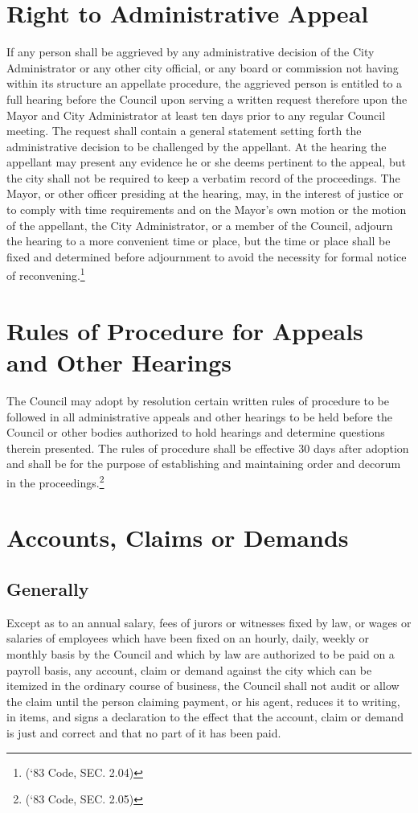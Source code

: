 \section{Right to Administrative Appeal}
If any person shall be aggrieved by any administrative decision of the City Administrator or any other city official, or any board or commission not having within its structure an appellate procedure, the aggrieved person is entitled to a full hearing before the Council upon serving a written request therefore upon the Mayor and City Administrator at least ten days prior to any regular Council meeting. The request shall contain a general statement setting forth the administrative decision to be challenged by the appellant. At the hearing the appellant may present any evidence he or she deems pertinent to the appeal, but the city shall not be required to keep a verbatim record of the proceedings. The Mayor, or other officer presiding at the hearing, may, in the interest of justice or to comply with time requirements and on the Mayor’s own motion or the motion of the appellant, the City Administrator, or a member of the Council, adjourn the hearing to a more convenient time or place, but the time or place shall be fixed and determined before adjournment to avoid the necessity for formal notice of reconvening.\footnote{(‘83 Code, SEC. 2.04)}

\section{Rules of Procedure for Appeals and Other Hearings}
The Council may adopt by resolution certain written rules of procedure to be followed in all administrative appeals and other hearings to be held before the Council or other bodies authorized to hold hearings and determine questions therein presented.  The rules of procedure shall be effective 30 days after adoption and shall be for the purpose of establishing and maintaining order and decorum in the proceedings.\footnote{(‘83 Code, SEC. 2.05)}

\section{Accounts, Claims or Demands}
\subsection{Generally} Except as to an annual salary, fees of jurors or witnesses fixed by law, or wages or salaries of employees which have been fixed on an hourly, daily, weekly or monthly basis by the Council and which by law are authorized to be paid on a payroll basis, any account, claim or demand against the city which can be itemized in the ordinary course of business, the Council shall not audit or allow the claim until the person claiming payment, or his agent, reduces it to writing, in items, and signs a declaration to the effect that the account, claim or demand is just and correct and that no part of it has been paid.
